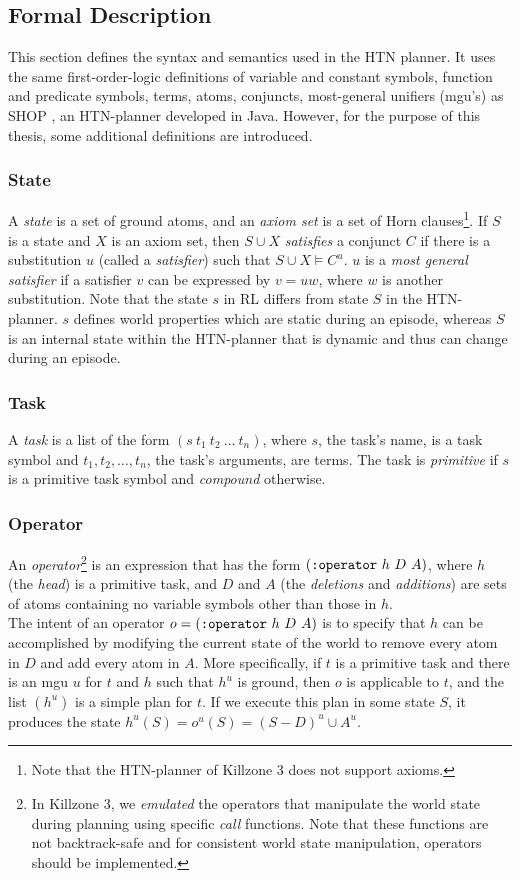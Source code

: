 \subsection{Formal Description}
This section defines the syntax and semantics used in the HTN planner. It uses
the same first-order-logic definitions of variable and constant symbols,
function and predicate symbols, terms, atoms, conjuncts, most-general unifiers
(mgu's) as SHOP \cite{shop}, an HTN-planner developed in Java. However, for the
purpose of this thesis, some additional definitions are introduced.

\subsubsection{State}
A \emph{state} is a set of ground atoms, and an \emph{axiom set} is a set of
Horn clauses\footnote{Note that the HTN-planner of Killzone 3 does not support
axioms.}. If $S$ is a state and $X$ is an axiom set, then $S \cup X$
\emph{satisfies} a conjunct $C$ if there is a substitution $u$ (called a
\emph{satisfier}) such that $S \cup X \vDash C^u$. $u$ is a \emph{most general
satisfier} if a satisfier $v$ can be expressed by $v = uw$, where $w$ is
another substitution. Note that the state $s$ in RL differs from state $S$ in
the HTN-planner. $s$ defines world properties which are static during an
episode, whereas $S$ is an internal state within the HTN-planner that is
dynamic and thus can change during an episode.
\subsubsection{Task}
A \emph{task} is a list of the form $(s~t_1~t_2~\dots~t_n)$, where $s$, the
task's name, is a task symbol and $t_1, t_2, \dots, t_n$,  the task's
arguments, are terms. The task is \emph{primitive} if $s$ is a primitive task
symbol and \emph{compound} otherwise.
\subsubsection{Operator}
An \emph{operator}\footnote{In Killzone 3, we \emph{emulated} the operators
that manipulate the world state during planning using specific \emph{call}
functions. Note that these functions are not backtrack-safe and for consistent
world state manipulation, operators should be implemented.} is an expression
that has the form $(\verb|:operator|~h~D~A)$, where $h$ (the \emph{head}) is a
primitive task, and $D$ and $A$ (the \emph{deletions} and \emph{additions}) are
sets of atoms containing no variable symbols other than those in $h$. \\ The
intent of an operator $o = (\verb|:operator|~h~D~A)$ is to specify that $h$ can
be accomplished by modifying the current state of the world to remove every
atom in $D$ and add every atom in $A$. More specifically, if $t$ is a primitive
task and there is an mgu $u$ for $t$ and $h$ such that $h^u$ is ground, then
$o$ is applicable to $t$, and the list $(h^u)$ is a simple plan for $t$. If we
execute this plan in some state $S$, it produces the state $h^u(S) = o^u(S) =
(S - D)^u \cup A^u$.
